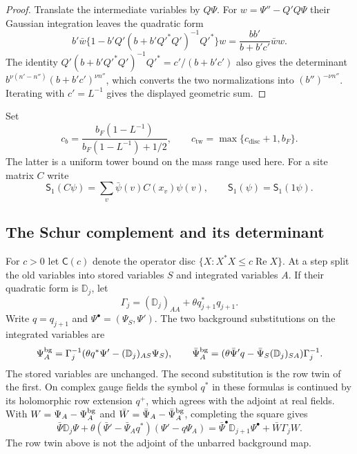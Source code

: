 \documentclass[11pt,letterpaper,reqno]{amsart}
\theoremstyle{definition}
\theoremstyle{remark}
\begin{document}
\begin{proof}
Translate the intermediate variables by $Q\Psi$.  For
$w=\Psi''-Q'Q\Psi$ their Gaussian integration leaves the quadratic
form
\[
 b'\bar w\{1-b'Q'(b+b'Q'^*Q')^{-1}Q'^*\}w
       =\frac{bb'}{b+b'c'}\bar ww.
\]
The identity
$Q'(b+b'Q'^*Q')^{-1}Q'^*=c'/(b+b'c')$
also gives the determinant
$b^{\nu(n'-n'')}(b+b'c')^{\nu n''}$, which converts the two
normalizations into $(b'')^{-\nu n''}$.
Iterating with $c'=L^{-1}$ gives the displayed geometric sum.
\end{proof}

Set
\[
 c_b=\frac{b_F(1-L^{-1})}{b_F(1-L^{-1})+1/2},\qquad
 c_{\mathrm{tw}}=\max\{c_{\mathrm{disc}}+1,b_F\}.
\]
The latter is a uniform tower bound on the mass range used here.
For a site matrix $C$ write
\[
 \mathsf S_1(C\psi)=\sum_v\bar\psi(v)C(x_v)\psi(v),\qquad
 \mathsf S_1(\psi)=\mathsf S_1(1\psi).
\]

\subsection{The Schur complement and its determinant}

For $c>0$ let $\mathsf C(c)$ denote the operator disc
$\{X:X^*X\le c\operatorname{Re}X\}$.
At a step split the old variables into stored variables $S$ and
integrated variables $A$.  If their quadratic form is $\mathbb D_j$,
let
\[
 \Gamma_j=(\mathbb D_j)_{AA}+\theta q_{j+1}^*q_{j+1}.
\]
Write $q=q_{j+1}$ and $\Psi^\bullet=(\Psi_S,\Psi')$. The two
background substitutions on the integrated variables are
\[
 \Psi_A^{\rm bg}=\Gamma_j^{-1}
       (\theta q^*\Psi'-(\mathbb D_j)_{AS}\Psi_S),\qquad
 \bar\Psi_A^{\rm bg}=
       (\theta\bar\Psi' q-\bar\Psi_S(\mathbb D_j)_{SA})\Gamma_j^{-1}.
\]
The stored variables are unchanged. The second substitution is
the row twin of the first. On complex gauge fields the symbol
$q^*$ in these formulas is continued by its holomorphic row
extension $q^+$, which agrees with the adjoint at real fields.
With $W=\Psi_A-\Psi_A^{\rm bg}$ and
$\bar W=\bar\Psi_A-\bar\Psi_A^{\rm bg}$, completing the square gives
\[
 \bar\Psi\mathbb D_j\Psi+
 \theta(\bar\Psi'-\bar\Psi_Aq^*)(\Psi'-q\Psi_A)
 =\bar\Psi^\bullet\mathbb D_{j+1}\Psi^\bullet+
                          \bar W\Gamma_jW.
\]
The row twin above is not the adjoint of the unbarred background map.
\end{document}
